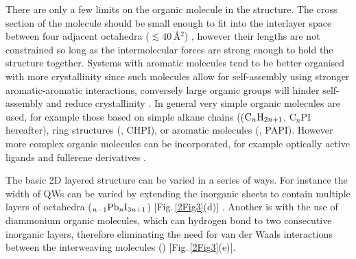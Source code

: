 There are only a few limits on the organic molecule  in the structure. The cross section of the molecule should be small enough to fit into the interlayer space between four adjacent octahedra ($\lesssim 40$\,\AA$^2$) \cite{Mitzi2001a}, however their lengths are not constrained so long as the intermolecular forces are strong enough to hold the structure together. Systems with aromatic molecules tend to be better organised with more crystallinity since such molecules allow for self-assembly using stronger aromatic-aromatic interactions, conversely large organic groups will hinder self-assembly and reduce crystallinity \cite{Zhang2009}. In general very simple organic molecules are used, for example those based on simple alkane chains (($\textnormal{C}_n\textnormal{H}_{2n+1}$, C$_n$PI hereafter), ring structures (, CHPI), or aromatic molecules (, PAPI). However more complex organic molecules can be incorporated, for example optically active ligands \cite{Billing2006, Teshima2003} and fullerene derivatives \cite{Kikuchi2005, Kawabata2009}. 

The basic 2D layered structure can be varied in a series of ways. For instance the width of QWs	can be varied by extending the inorganic sheets to contain multiple layers of  octahedra ($_{n-1}\textnormal{Pb}_n\textnormal{I}_{3n+1}$) [Fig.\,\ref{2Fig3}(d)] \cite{Calabrese1991}. Another is with the use of diammonium organic molecules, which can hydrogen bond to two consecutive inorganic layers, therefore eliminating the need for van der Waals interactions between the interweaving molecules () [Fig.\,\ref{2Fig3}(e)].

